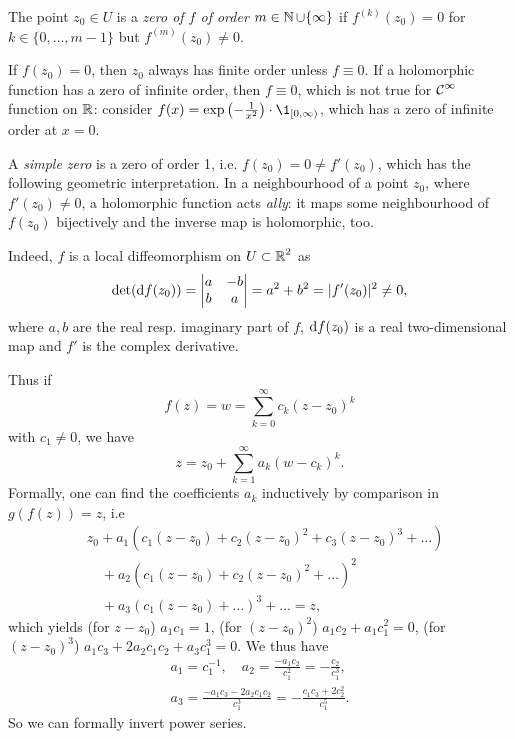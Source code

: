 \documentclass[a4paper,english]{article}
\begin{document}
\begin{defn}
    The point $z_0 \in U$ is a \emph{zero of $f$ of order $m \in \operatorname{\mathbb{N}} \cup \{ \infty\}$} if $f^{(k)}(z_0) = 0$ for $k \in \{0, \ldots, m - 1\}$ but $f^{(m)}(z_0) \ne 0$.
\end{defn}

\begin{remark}
    If $f(z_0) = 0$, then $z_0$ always has finite order unless $f \equiv 0$.
    If a holomorphic function has a zero of infinite order, then $f \equiv 0$, which is not true for $\operatorname{\mathcal{C}}^{\infty}$ function on $\operatorname{\mathbb{R}}$: consider $f(x) = \exp\left(-\frac{1}{x^2}\right) \cdot \1_{[0, \infty)}$, which has a zero of infinite order at $x = 0$.
\end{remark}

A \emph{simple zero} is a zero of order 1, i.e. $f(z_0) = 0 \ne f'(z_0)$, which has the following geometric interpretation.
In a neighbourhood of a point $z_0$, where $f'(z_0) \ne 0$, a holomorphic function acts \emph{ally}: it maps some neighbourhood of $f(z_0)$ bijectively and the inverse map is holomorphic, too.

Indeed, $f$ is a local diffeomorphism on $U \subset \operatorname{\mathbb{R}}^2$ as
\begin{equation*}
    \det(\mathop{}\!\mathrm{d}{f(z_0}))
    = \begin{vmatrix} a & - b \\ b & a \end{vmatrix}
    = a^2 + b^2
    = | f'(z_0) |^2
    \ne 0,    
\end{equation*}
where $a,b$ are the real resp. imaginary part of $f$, $\mathop{}\!\mathrm{d}{f}(z_0)$ is a real two-dimensional map and $f'$ is the complex derivative.

Thus if 
\begin{equation*}
    f(z)
    = w
    = \sum_{k = 0}^{\infty} c_k (z - z_0)^k
\end{equation*}
with $c_1 \ne 0$, we have
\begin{equation*}
    z
    = z_0 + \sum_{k = 1}^{\infty} a_k(w - c_k)^k.
\end{equation*}
Formally, one can find the coefficients $a_k$ inductively by comparison in $g(f(z)) = z$, i.e
\begin{align*}
    & z_0 + a_1\left( c_1(z - z_0) + c_2 (z - z_0)^2 + c_3 (z - z_0)^3 + \ldots \right) \\
    & \quad + a_2 \left(c_1 (z - z_0) + c_2 (z - z_0)^2 + \ldots \right)^2 \\
    & \quad + a_3 \left( c_1 (z - z_0) + \ldots \right)^3 + \ldots
    = z,
\end{align*}
which yields (for $z - z_0$) $a_1 c_1 = 1$, (for $(z - z_0)^2$) $a_1 c_2 + a_1 c_1^2 = 0$, (for $(z - z_0)^3$) $a_1 c_3 + 2 a_2 c_1 c_2 + a_3 c_1^3 = 0$.
We thus have
\begin{gather*}
    a_1 = c_1^{-1}, \quad
    a_2 = \frac{- a_1 c_2}{c_1^2} = - \frac{c_2}{c_1^3}, \\
    a_3 = \frac{-a_1 c_3 - 2 a_2 c_1 c_2}{c_1^3}
    = - \frac{c_1 c_3 + 2 c_2^2}{c_1^5}.
\end{gather*}
So we can formally invert power series.
\end{document}
